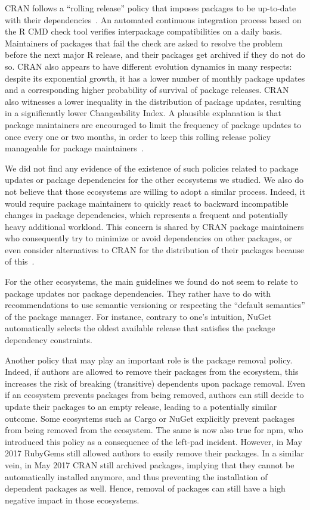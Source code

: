 \documentclass[smallextended]{svjour3}       %
\newcommand{\cran}{\textsf{CRAN}\xspace}
\newcommand{\rubygems}{\textsf{RubyGems}\xspace}
\newcommand{\cargo}{\textsf{Cargo}\xspace}
\newcommand{\nuget}{\textsf{NuGet}\xspace}
\newcommand{\npm}{\textsf{npm}\xspace}
\newcommand{\R}{\textsf{R}\xspace}
\begin{document}
\cran follows a ``rolling release'' policy that imposes packages to be up-to-date with their dependencies~\cite{CRAN}. An automated continuous integration process based on the R CMD check tool verifies interpackage compatibilities on a daily basis. Maintainers of packages that fail the check are asked to resolve the problem before the next major \R release, and their packages get archived if they do not do so.
\cran also appears to have different evolution dynamics in many respects: despite its exponential growth, it has a lower number of monthly package updates and a corresponding higher probability of survival of package releases. \cran also witnesses a lower inequality in the distribution of package updates, resulting in a significantly lower Changeability Index.
A plausible explanation is that package maintainers are encouraged to limit the frequency of package updates to once every one or two months, in order to keep this rolling release policy manageable for package maintainers~\cite{CRAN}.

We did not find any evidence of the existence of such policies related to package updates or package dependencies for the other  ecosystems we studied. We also do not believe that those ecosystems are willing to adopt a similar process. 
Indeed, it would require package maintainers to quickly react to backward incompatible changes in package dependencies, which  represents a frequent and potentially heavy additional workload. 
This concern is shared by \cran package maintainers who consequently try to minimize or avoid dependencies on other packages, or even consider alternatives to \cran for the distribution of their packages because of this~\cite{Decan2016SANER,Bogart2015,Mens2015}.  

For the other ecosystems, the main guidelines we found do not seem to relate to package updates nor package dependencies. They rather have to do with recommendations to use semantic versioning or respecting the ``default semantics'' of the package manager. 
For instance, contrary to one's intuition, \nuget automatically selects the oldest available release that satisfies the package dependency constraints.

Another policy that may play an important role is the package removal policy. Indeed, if authors are allowed to remove their packages from the ecosystem, this increases the risk of breaking (transitive) dependents upon package removal.
Even if an ecosystem prevents packages from being removed, authors can still decide to update their packages to an empty release, leading to a potentially  similar outcome.
Some ecosystems such as \cargo or \nuget explicitly prevent packages from being removed from the ecosystem. The same is now also true for \npm, who introduced this policy as a consequence of the \textsf{left-pad} incident. However, in May 2017 \rubygems still allowed authors to easily remove their packages. In a similar vein, in May 2017  \cran still archived packages, implying that they cannot be automatically installed anymore, and thus preventing the installation of dependent packages as well. 
Hence, removal of packages can still have a high negative impact in those ecosystems.
\end{document}
